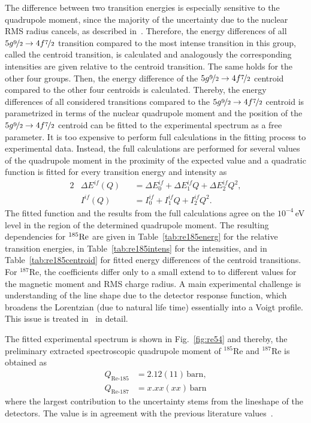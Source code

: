 The difference between two transition energies is especially sensitive to the quadrupole moment, since the majority of the uncertainty due to the nuclear RMS radius cancels, as described in~\cite{konijn1979}. Therefore, the energy differences of all $5g\nicefrac{9}{2}\rightarrow4f\nicefrac{7}{2}$ transition compared to the most intense transition in this group, called the centroid transition, is calculated and analogously the corresponding intensities are given relative to the centroid transition. 
The same holds for the other four groups. Then, the energy difference of the $5g\nicefrac{9}{2}\rightarrow4f\nicefrac{7}{2}$ centroid compared to the other four centroids is calculated. 
Thereby, the energy differences of all considered transitions compared to the $5g\nicefrac{9}{2}\rightarrow4f\nicefrac{7}{2}$ centroid is parametrized in terms of the nuclear quadrupole moment and the position of the $5g\nicefrac{9}{2}\rightarrow4f\nicefrac{7}{2}$ centroid can be fitted to the experimental spectrum as a free parameter.
It is too expensive to perform full calculations in the fitting process to experimental data. Instead, the full calculations are performed for several values of the quadrupole moment in the proximity of the expected value and a quadratic function is fitted for every transition energy and intensity as
\begin{alignat}{2}
&\Delta E^{if}(Q)&&= \Delta E^{if}_0 +  \Delta E^{if}_1 Q+  \Delta E^{if}_2 Q^2,\label{eq:en_fit}\\
&I^{if}(Q)&&= I^{if}_0 +  I^{if}_1 Q+  I^{if}_2 Q^2.\label{eq:tran_fit}
\end{alignat} 
The fitted function and the results from the full calculations agree on the $10^{-4}\,$eV level in the region of the determined quadrupole moment. The resulting dependencies for $^{185}\rm{Re}$ are given in Table~\ref{tab:re185energ} for the relative transition energies, in Table~\ref{tab:re185intens} for the intensities, and in Table~\ref{tab:re185centroid} for fitted energy differences of the centroid transitions. For $^{187}$Re, the coefficients differ only to a small extend to to different values for the magnetic moment and RMS charge radius. 
A main experimental challenge is understanding of the line shape due to the detector response function, which broadens the Lorentzian (due to natural life time) essentially into a Voigt profile. This issue is treated in~\cite{vogiatzi2018} in detail.

The fitted experimental spectrum is shown in Fig.~\ref{fig:re54} and thereby, the preliminary extracted spectroscopic quadrupole moment of $^{185}$Re and $^{187}$Re is obtained as
\begin{align}
Q_{\text{Re-}185} &= 2.12(11)\,\text{barn},\\
Q_{\text{Re-}187} &= x.xx(xx)\,\text{barn}
\end{align}
where the largest contribution to the uncertainty stems from the lineshape of the detectors. The value is in agreement with the previous literature values~\cite{Stone2005}.

